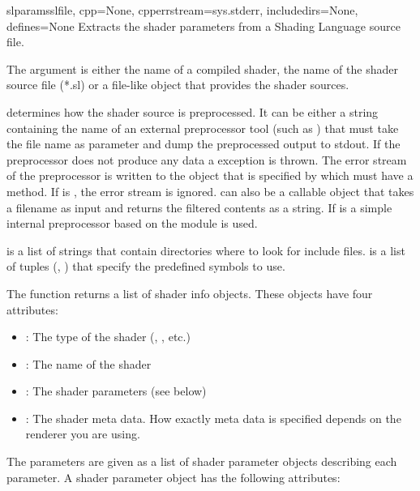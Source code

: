 \begin{funcdesc}{slparams}{slfile, cpp=None, cpperrstream=sys.stderr, includedirs=None, defines=None}
Extracts the shader parameters from a Shading Language source file. 

The argument  is either the name of a compiled shader, the
name of the shader source file (*.sl) or a file-like object that provides the
shader sources.

 determines how the shader source is preprocessed. It can be
either a string containing the name of an external preprocessor tool
(such as ) that must take the file name as parameter and
dump the preprocessed output to stdout. If the preprocessor does not
produce any data a  exception is
thrown. The error stream of the preprocessor is written to the object
that is specified by  which must have a
 method. If  is , the error 
stream is ignored.  can also be a callable object that takes a
filename as input and returns the filtered contents as a string. If
 is  a simple internal preprocessor based on the 
 module is used.

 is a list of strings that contain directories where to 
look for include files.  is a list of tuples (,
) that specify the predefined symbols to use.

The function returns a list of shader info objects. These objects have
four attributes:
    
\begin{itemize}
  \item {}: The type of the shader (,
  , etc.)
  \item {}: The name of the shader
  \item {}: The shader parameters (see below)
  \item {}: The shader meta data. How exactly meta data is specified
  depends on the renderer you are using.
\end{itemize}
     
The parameters are given as a list of shader parameter objects describing each
parameter. A shader parameter object has the following attributes:


\end{funcdesc}
